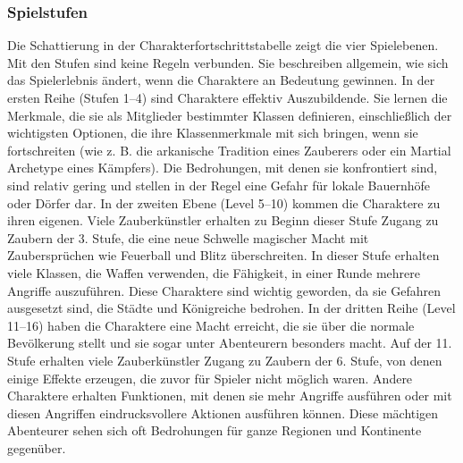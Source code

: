 \subsubsection{Spielstufen}
Die Schattierung in der Charakterfortschrittstabelle zeigt die vier Spielebenen. Mit den Stufen sind keine Regeln verbunden. Sie beschreiben allgemein, wie sich das Spielerlebnis ändert, wenn die Charaktere an Bedeutung gewinnen.
In der ersten Reihe (Stufen 1–4) sind Charaktere effektiv Auszubildende. Sie lernen die Merkmale, die sie als Mitglieder bestimmter Klassen definieren,
einschließlich der wichtigsten Optionen, die ihre Klassenmerkmale mit sich bringen, wenn sie fortschreiten (wie z. B. die arkanische Tradition eines Zauberers oder ein Martial Archetype eines Kämpfers). Die Bedrohungen, mit denen sie konfrontiert sind, sind relativ gering und stellen in der Regel eine Gefahr für lokale Bauernhöfe oder Dörfer dar.
In der zweiten Ebene (Level 5–10) kommen die Charaktere zu ihren eigenen. Viele Zauberkünstler erhalten zu Beginn dieser Stufe Zugang zu Zaubern der 3. Stufe, die eine neue Schwelle magischer Macht mit Zaubersprüchen wie Feuerball und Blitz überschreiten. In dieser Stufe erhalten viele Klassen, die Waffen verwenden, die Fähigkeit, in einer Runde mehrere Angriffe auszuführen. Diese
Charaktere sind wichtig geworden, da sie Gefahren ausgesetzt sind, die Städte und Königreiche bedrohen.
In der dritten Reihe (Level 11–16) haben die Charaktere eine Macht erreicht, die sie über die normale Bevölkerung stellt und sie sogar unter Abenteurern besonders macht. Auf der 11. Stufe erhalten viele Zauberkünstler Zugang zu Zaubern der 6. Stufe, von denen einige Effekte erzeugen, die zuvor für Spieler nicht möglich waren. Andere Charaktere erhalten Funktionen, mit denen sie mehr Angriffe ausführen oder mit diesen Angriffen eindrucksvollere Aktionen ausführen können. Diese mächtigen Abenteurer sehen sich oft Bedrohungen für ganze Regionen und Kontinente gegenüber.

